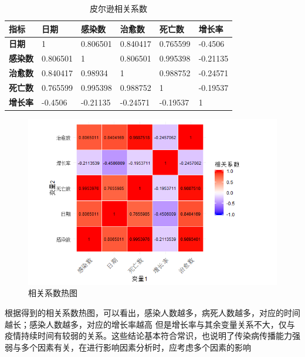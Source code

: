 \documentclass[a4paper, 11pt,twoside=true,UTF8]{scrartcl}
\begin{document}
\begin{table}[H]
	\centering
	\caption{皮尔逊相关系数} \label{P3T2}
	\begin{tabular}{|l|l|l|l|l|l|}
		\hline
		\textbf{指标}  & \textbf{日期} & \textbf{感染数} & \textbf{治愈数} & \textbf{死亡数} & \textbf{增长率} \\ \hline
		\textbf{日期}  & 1           & 0.806501     & 0.840417     & 0.765599     & -0.4506      \\ \hline
		\textbf{感染数} & 0.806501    & 1            & 0.806501     & 0.995398     & -0.21135     \\ \hline
		\textbf{治愈数} & 0.840417    & 0.98934      & 1            & 0.988752     & -0.24571     \\ \hline
		\textbf{死亡数} & 0.765599    & 0.995398     & 0.988752     & 1            & -0.19537     \\ \hline
		\textbf{增长率} & -0.4506     & -0.21135     & -0.24571     & -0.19537     & 1            \\ \hline
	\end{tabular}
\end{table}

\begin{figure}[h]
	\small
	\centering
	\includegraphics[width=14cm]{P3F2}
	\caption{相关系数热图} \label{P3F2}
\end{figure}

根据得到的相关系数热图，可以看出，感染人数越多，病死人数越多，对应的时间越长；感染人数越多，对应的增长率越高 但是增长率与其余变量关系不大，仅与疫情持续时间有较弱的关系。这些结论基本符合常识，也说明了传染病传播能力强弱与多个因素有关，在进行影响因素分析时，应考虑多个因素的影响
\end{document}
